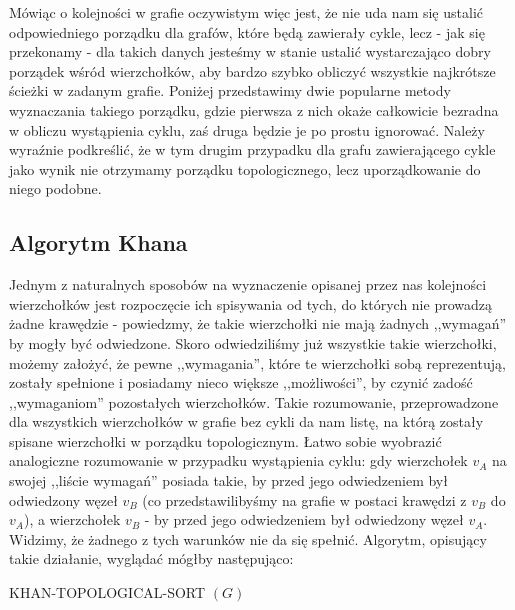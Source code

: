 Mówiąc o kolejności w grafie oczywistym więc jest, że nie uda nam się ustalić odpowiedniego porządku dla grafów, które będą zawierały cykle, lecz - jak się przekonamy - dla takich danych jesteśmy w stanie ustalić wystarczająco dobry porządek wśród wierzchołków, aby bardzo szybko obliczyć wszystkie najkrótsze ścieżki w zadanym grafie. Poniżej przedstawimy dwie popularne metody wyznaczania takiego porządku, gdzie pierwsza z nich okaże całkowicie bezradna w obliczu wystąpienia cyklu, zaś druga będzie je po prostu ignorować. Należy wyraźnie podkreślić, że w tym drugim przypadku dla grafu zawierającego cykle jako wynik nie otrzymamy porządku topologicznego, lecz uporządkowanie do niego podobne.

\subsection{Algorytm Khana}

Jednym z naturalnych sposobów na wyznaczenie opisanej przez nas kolejności wierzchołków jest rozpoczęcie ich spisywania od tych, do których nie prowadzą żadne krawędzie - powiedzmy, że takie wierzchołki nie mają żadnych ,,wymagań'' by mogły być odwiedzone. Skoro odwiedziliśmy już wszystkie takie wierzchołki, możemy założyć, że pewne ,,wymagania'', które te wierzchołki sobą reprezentują, zostały spełnione i posiadamy nieco większe ,,możliwości'', by czynić zadość ,,wymaganiom'' pozostałych wierzchołków. Takie rozumowanie, przeprowadzone dla wszystkich wierzchołków w grafie bez cykli da nam listę, na którą zostały spisane wierzchołki w porządku topologicznym. Łatwo sobie wyobrazić analogiczne rozumowanie w przypadku wystąpienia cyklu: gdy wierzchołek $v_{A}$ na swojej ,,liście wymagań'' posiada takie, by przed jego odwiedzeniem był odwiedzony węzeł $v_{B}$ (co przedstawilibyśmy na grafie w postaci krawędzi z $v_{B}$ do $v_{A}$), a wierzchołek $v_{B}$ - by przed jego odwiedzeniem był odwiedzony węzeł $v_{A}$. Widzimy, że żadnego z tych warunków nie da się spełnić. Algorytm, opisujący takie działanie, wyglądać mógłby następująco:

\begin{algorithm}[!htbp]
\DontPrintSemicolon
{}
\caption{ KHAN-TOPOLOGICAL-SORT $\left( G \right)$\label{alg:KhanTopologicalSort}}
\end{algorithm}

